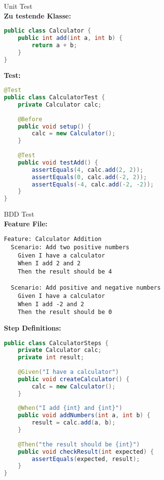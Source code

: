 \begin{example}{Unit Test}\\
\textbf{Zu testende Klasse:}
\begin{lstlisting}[language=Java, style=base]
public class Calculator {
    public int add(int a, int b) {
        return a + b;
    }
}
\end{lstlisting}

\textbf{Test:}
\begin{lstlisting}[language=Java, style=base]
@Test
public class CalculatorTest {
    private Calculator calc;
    
    @Before
    public void setup() {
        calc = new Calculator();
    }
    
    @Test
    public void testAdd() {
        assertEquals(4, calc.add(2, 2));
        assertEquals(0, calc.add(-2, 2));
        assertEquals(-4, calc.add(-2, -2));
    }
}
\end{lstlisting}
\end{example}

\begin{example}{BDD Test}\\
\textbf{Feature File:}
\begin{lstlisting}[style=basesmol]
Feature: Calculator Addition
  Scenario: Add two positive numbers
    Given I have a calculator
    When I add 2 and 2
    Then the result should be 4
    
  Scenario: Add positive and negative numbers
    Given I have a calculator
    When I add -2 and 2
    Then the result should be 0
\end{lstlisting}

\textbf{Step Definitions:}
\begin{lstlisting}[language=Java, style=base]
public class CalculatorSteps {
    private Calculator calc;
    private int result;
    
    @Given("I have a calculator")
    public void createCalculator() {
        calc = new Calculator();
    }
    
    @When("I add {int} and {int}")
    public void addNumbers(int a, int b) {
        result = calc.add(a, b);
    }
    
    @Then("the result should be {int}")
    public void checkResult(int expected) {
        assertEquals(expected, result);
    }
}
\end{lstlisting}
\end{example}
